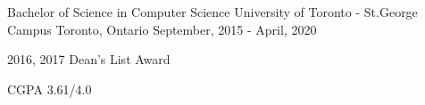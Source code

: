 


\begin{cventries}


\cventry
{Bachelor of Science in Computer Science} %
{University of Toronto - St.George Campus} %
{Toronto, Ontario} %
{September, 2015 - April, 2020} %
{ %
\begin{cvitems}
\item {2016, 2017 Dean's List Award}
\item {CGPA 3.61/4.0}
\end{cvitems}
}


\end{cventries}